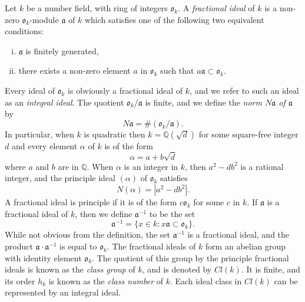 Let $k$ be a number field, with ring of integers $\mathfrak{o}_{k}$.  A
\emph{fractional ideal} of $k$ is a non-zero $\mathfrak{o}_{k}$-module $\mathfrak{a}$
of $k$ which satisfies one of the following two equivalent conditions:
\begin{enumerate}[(i)]
\item $\mathfrak{a}$ is finitely generated,
\item there exists a non-zero element $a$ in $\mathfrak{o}_{k}$ such that
  $a\mathfrak{a} \subset \mathfrak{o}_{k}$.
\end{enumerate}
Every ideal of $\mathfrak{o}_{k}$ is obviously a fractional ideal of $k$, and we
refer to such an ideal as an \emph{integral ideal}.  The quotient $\mathfrak{o}_{k} /
\mathfrak{a}$ is finite, and we define the \emph{norm $N\mathfrak{a}$ of
  $\mathfrak{a}$} by
\begin{equation*}
  N\mathfrak{a} = \# ( \mathfrak{o}_{k} / \mathfrak{a} ).
\end{equation*}
In particular, when $k$ is quadratic then $k = \mathbb{Q}(\sqrt{d})$ for some
square-free integer $d$ and every element $\alpha$ of $k$ is of the form
\begin{equation*}
  \alpha = a + b\sqrt{d}
\end{equation*}
where $a$ and $b$ are in $\mathbb{Q}$.  When $\alpha$ is an integer in $k$, then
$a^{2} - db^{2}$ is a rational integer, and the principle ideal $(\alpha)$ of
$\mathfrak{o}_{k}$ satisfies
\begin{equation*}
  N(\alpha) = |a^{2} - db^{2}|.
\end{equation*}
  A fractional ideal is principle
if it is of the form $c\mathfrak{o}_{k}$ for some $c$ in $k$.  If $\mathfrak{a}$ is a
fractional ideal of $k$, then we define $\mathfrak{a}^{-1}$ to be the set
\begin{equation*}
  \mathfrak{a}^{-1} = \{x \in k \colon x\mathfrak{a} \subset \mathfrak{o}_{k}\}.
\end{equation*}
While not obvious from the definition, the set $\mathfrak{a}^{-1}$ is a fractional
ideal, and the product $\mathfrak{a} \cdot \mathfrak{a}^{-1}$ is equal to
$\mathfrak{o}_{k}$.  The fractional ideals of $k$ form an abelian group with identity
element $\mathfrak{o}_{k}$.  The quotient of this group by the principle fractional
ideals is known as the \emph{class group} of $k$, and is denoted by $Cl(k)$.  It is
finite, and its order $h_{k}$ is known as the \emph{class number} of $k$.  Each ideal
class in $Cl(k)$ can be represented by an integral ideal.

